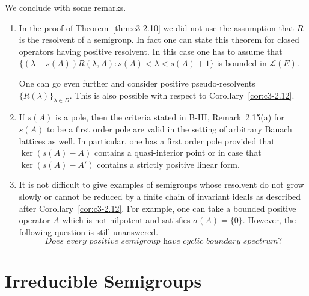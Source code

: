 We conclude with some remarks.
\begin{remarks}\label{rem:c3-2.15}
\begin{enumerate}[\upshape (i), wide, labelindent=.5em]	
	\item 
	In the proof of Theorem~\ref{thm:c3-2.10} we did not use the assumption that $R$ is the resolvent of a semigroup.
	In fact one can state this theorem for closed operators having positive resolvent.
	In this case one has to assume that $\{(\lambda-s(A))R(\lambda,A) \colon s(A) < \lambda < s(A)+1\}$ is bounded in $\mathcal{L}(E)$.
	
	One can go even further and consider positive pseudo-resolvents $\{R(\lambda)\}_{\lambda\in D}$.
	This is also possible with respect to Corollary~\ref{cor:c3-2.12}.
	
	\item 
	If $s(A)$ is a pole, then the criteria stated in B-III, Remark~2.15(a) for $s(A)$ to be a first order pole are valid in the setting of arbitrary Banach lattices as well.
	In particular, one has a first order pole provided that $\ker(s(A) - A)$ contains a quasi-interior point or in case that $\ker(s(A) - A')$ contains a strictly positive linear form.
	
	\item 
	It is not difficult to give examples of semigroups whose resolvent do not grow slowly or cannot be reduced by a finite chain of invariant ideals as described after Corollary~\ref{cor:c3-2.12}.
	For example, one can take a bounded positive operator $A$ which is not nilpotent and satisfies $\sigma(A) = \{0\}$.
	However, the following question is still unanswered.
	\begin{equation*}
		\textit{Does every positive semigroup have cyclic boundary spectrum?}
	\end{equation*}
\end{enumerate}
\end{remarks}

\section{Irreducible Semigroups}\label{sec:c3-3}

